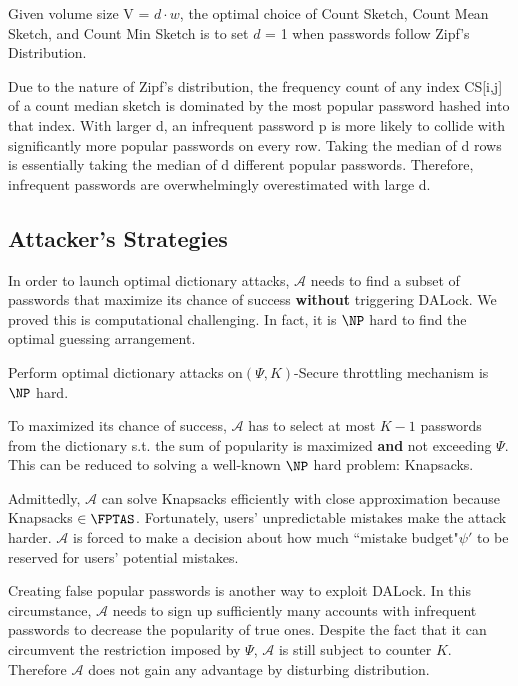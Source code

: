 \begin{theorem}
Given volume size V =  $d \cdot w$, the optimal choice of Count Sketch, Count Mean Sketch, and Count Min Sketch is to set $d$ = 1 when passwords follow Zipf's Distribution.
\end{theorem}
Due to the nature of Zipf's distribution, the frequency count of any index CS[i,j] of a count median sketch is dominated by the most popular password hashed into that index. With larger d, an infrequent password p is more likely to collide with significantly more popular passwords on every row. Taking the median of d rows is essentially taking the median of d different popular passwords. Therefore, infrequent passwords are overwhelmingly overestimated with large d. 

\subsection{Attacker's Strategies}
In order to launch optimal dictionary attacks, $\mathcal{A}$ needs to find a subset of passwords that maximize its chance of success \textbf{without} triggering DALock. We proved this is computational challenging. In fact, it is $\NP$ hard to find the optimal guessing arrangement.

Perform optimal dictionary attacks on$(\Psi, K)$-Secure throttling mechanism is $\NP$ hard.

To maximized its chance of success, $\mathcal{A}$ has to select at most $K-1$ passwords from the dictionary s.t. the sum of popularity is maximized \textbf{and} not exceeding $\Psi$. This can be reduced to solving a well-known $\NP$ hard problem: Knapsacks. 

Admittedly, $\mathcal{A}$ can solve Knapsacks efficiently with close approximation because Knapsacks $\in \FPTAS$. Fortunately, users' unpredictable mistakes make the attack harder. $\mathcal{A}$ is forced to make a decision about how much  ``mistake budget"$\psi'$ to be reserved for users' potential mistakes.

Creating false popular passwords is another way to exploit DALock. In this circumstance, $\mathcal{A}$ needs to sign up sufficiently many accounts with infrequent passwords to decrease the popularity of true ones. Despite the fact that it can circumvent the restriction imposed by $\Psi$, $\mathcal{A}$ is still subject to counter $K$. Therefore $\mathcal{A}$ does not gain any advantage by disturbing distribution. 

